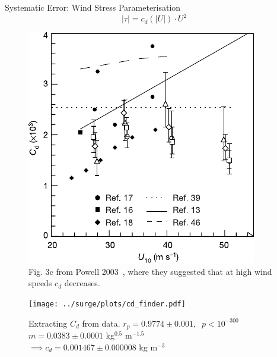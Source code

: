 \begin{frame}{Systematic Error: Wind Stress Parameterisation}
\vspace{-40pt}
\centering
\begin{equation}
 |\tau| = c_d(|U|) \cdot U^2
 \end{equation}
    \hspace{-30pt}\begin{minipage}{0.45\textwidth}
    \begin{figure}
            \includegraphics[width=1\linewidth]{images/example-images/cd.pdf}
                \caption{Fig. 3c from Powell 2003~\cite{powell2003reduced},
                 where they suggested that at high wind speeds $c_d$ decreases.}
    \end{figure}
    \end{minipage}\hspace{5pt}
      \begin{minipage}{0.57\textwidth}
\begin{figure}[htb!]
    \centering
    \texttt{[image: ../surge/plots/cd\_finder.pdf]}
    \caption{ Extracting $C_d$ from data.
    $ r_p = 0.9774 \pm 0.001,\;\; p<10^{-300}$\\
    $ m = 0.0383 \pm 0.0001 $ kg$^{0.5}$ m$^{-1.5}$\\
    $\implies  c_d = 0.001467 \pm 0.000008$ kg m$^{-3}$
    }
    \label{fig:}
\end{figure}
    \end{minipage}
\end{frame}
